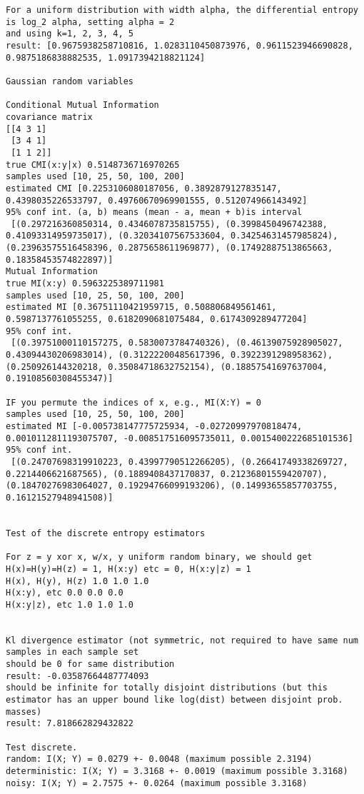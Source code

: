 \documentclass[10pt,a4paper]{article} %
\theoremstyle{definition}
\begin{document}
\begin{lstlisting}
For a uniform distribution with width alpha, the differential entropy is log_2 alpha, setting alpha = 2
and using k=1, 2, 3, 4, 5
result: [0.9675938258710816, 1.0283110450873976, 0.9611523946690828, 0.9875186838882535, 1.0917394218821124]

Gaussian random variables

Conditional Mutual Information
covariance matrix
[[4 3 1]
 [3 4 1]
 [1 1 2]]
true CMI(x:y|x) 0.5148736716970265
samples used [10, 25, 50, 100, 200]
estimated CMI [0.2253106080187056, 0.3892879127835147, 0.4398035226533797, 0.49760670969901555, 0.512074966143492]
95% conf int. (a, b) means (mean - a, mean + b)is interval
 [(0.297216360850314, 0.4346078735815755), (0.3998450496742388, 0.41093314959735017), (0.32034107567533604, 0.34254631457985824), (0.23963575516458396, 0.2875658611969877), (0.17492887513865663, 0.18358453574822897)]
Mutual Information
true MI(x:y) 0.5963225389711981
samples used [10, 25, 50, 100, 200]
estimated MI [0.36751110421959715, 0.508806849561461, 0.5987137761055255, 0.6182090681075484, 0.6174309289477204]
95% conf int.
 [(0.39751000110157275, 0.5830073784740326), (0.46139075928905027, 0.43094430206983014), (0.31222200485617396, 0.3922391298958362), (0.250926144320218, 0.35084718632752154), (0.18857541697637004, 0.19108560308455347)]

IF you permute the indices of x, e.g., MI(X:Y) = 0
samples used [10, 25, 50, 100, 200]
estimated MI [-0.005738147775725934, -0.02720997970818474, 0.0010112811193075707, -0.008517516095735011, 0.0015400222685101536]
95% conf int.
 [(0.24707698319910223, 0.43997790512266205), (0.26641749338269727, 0.2214406621687565), (0.1889408437170837, 0.21236801559420707), (0.18470276983064027, 0.19294766099193206), (0.14993655857703755, 0.16121527948941508)]


Test of the discrete entropy estimators

For z = y xor x, w/x, y uniform random binary, we should get H(x)=H(y)=H(z) = 1, H(x:y) etc = 0, H(x:y|z) = 1
H(x), H(y), H(z) 1.0 1.0 1.0
H(x:y), etc 0.0 0.0 0.0
H(x:y|z), etc 1.0 1.0 1.0


Kl divergence estimator (not symmetric, not required to have same num samples in each sample set
should be 0 for same distribution
result: -0.03587664487774093
should be infinite for totally disjoint distributions (but this estimator has an upper bound like log(dist) between disjoint prob. masses)
result: 7.818662829432822

Test discrete.
random: I(X; Y) = 0.0279 +- 0.0048 (maximum possible 2.3194)
deterministic: I(X; Y) = 3.3168 +- 0.0019 (maximum possible 3.3168)
noisy: I(X; Y) = 2.7575 +- 0.0264 (maximum possible 3.3168)
\end{lstlisting}
\end{document}
